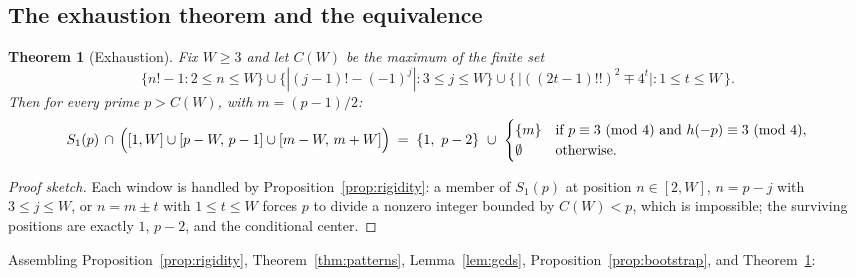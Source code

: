 \documentclass[11pt]{article}
\newtheorem{theorem}{Theorem}[section]
\theoremstyle{definition}
\theoremstyle{remark}
\begin{document}
\subsection{The exhaustion theorem and the equivalence}

\begin{theorem}[Exhaustion]\label{thm:exhaustion}
Fix $W \ge 3$ and let $C(W)$ be the maximum of the finite set
\[
  \{n! - 1 : 2 \le n \le W\} \cup \{|(j-1)! - (-1)^j| : 3 \le j \le W\}
  \cup \{\,\bigl|((2t-1)!!)^2 \mp 4^t\bigr| : 1 \le t \le W\,\}.
\]
Then for every prime $p > C(W)$, with $m = (p-1)/2$:
\[
  S_1(p) \,\cap\, \Bigl([1, W] \cup [p-W,\, p-1] \cup [m-W,\, m+W]\Bigr)
  \;=\;
  \{1,\ p-2\} \ \cup\
  \begin{cases}
    \{m\} & \text{if } p \equiv 3 \ (\mathrm{mod}\ 4) \text{ and }
             h(-p) \equiv 3 \ (\mathrm{mod}\ 4), \\
    \emptyset & \text{otherwise.}
  \end{cases}
\]
\end{theorem}

\begin{proof}[Proof sketch]
Each window is handled by Proposition~\ref{prop:rigidity}: a member of
$S_1(p)$ at position $n \in [2, W]$, $n = p-j$ with $3 \le j \le W$, or
$n = m \pm t$ with $1 \le t \le W$ forces $p$ to divide a nonzero integer
bounded by $C(W) < p$, which is impossible; the surviving positions are
exactly $1$, $p-2$, and the conditional center.
\end{proof}

Assembling Proposition~\ref{prop:rigidity},
Theorem~\ref{thm:patterns}, Lemma~\ref{lem:gcds},
Proposition~\ref{prop:bootstrap}, and Theorem~\ref{thm:exhaustion}:
\end{document}
